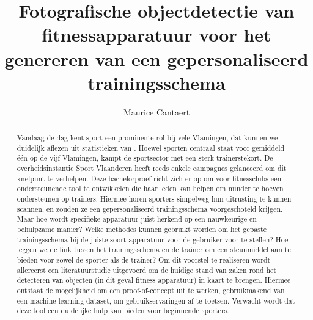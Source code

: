 \documentclass{hogent-article}
\title{Fotografische objectdetectie van fitnessapparatuur voor het genereren van een gepersonaliseerd trainingsschema}
\author{Maurice Cantaert}
\begin{document}
    \begin{abstract}
        Vandaag de dag kent sport een prominente rol bij vele Vlamingen, dat kunnen we duidelijk aflezen uit statistieken van \textcite{StatistiekVlaanderen2023} .
        Hoewel sporten centraal staat voor gemiddeld \'e\'en op de vijf Vlamingen, kampt de sportsector met een sterk trainerstekort. \autocite{SportVlaanderen2023}
        De overheidsinstantie Sport Vlaanderen heeft reeds enkele campagnes gelanceerd om dit knelpunt te verhelpen.
        Deze bachelorproef richt zich er op om voor fitnessclubs een ondersteunende tool te ontwikkelen die haar leden kan helpen om minder te hoeven ondersteunen op trainers.
        Hiermee horen sporters simpelweg hun uitrusting te kunnen scannen, en zouden ze een gepersonaliseerd trainingsschema voorgeschoteld krijgen.
        Maar hoe wordt specifieke apparatuur juist herkend op een nauwkeurige en behulpzame manier?
        Welke methodes kunnen gebruikt worden om het gepaste trainingsschema bij de juiste soort apparatuur voor de gebruiker voor te stellen?
        Hoe leggen we de link tussen het trainingsschema en de trainer om een steunmiddel aan te bieden voor zowel de sporter als de trainer?
        Om dit voorstel te realiseren wordt allereerst een literatuurstudie uitgevoerd om de huidige stand van zaken rond het detecteren van objecten (in dit geval fitness apparatuur) in kaart te brengen.
        Hiermee ontstaat de mogelijkheid om een proof-of-concept uit te werken, gebruikmakend van een machine learning dataset, om gebruikservaringen af te toetsen.
        Verwacht wordt dat deze tool een duidelijke hulp kan bieden voor beginnende sporters.
    \end{abstract}

    \tableofcontents

    

    \printbibliography[heading=bibintoc]
\end{document}
